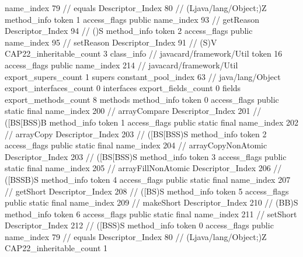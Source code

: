 {{{{{					name_index	79		// equals
					Descriptor_Index	80		// (Ljava/lang/Object;)Z
				}
				method_info {
					token	1
					access_flags	public
					name_index	93		// getReason
					Descriptor_Index	94		// ()S
				}
				method_info {
					token	2
					access_flags	public
					name_index	95		// setReason
					Descriptor_Index	91		// (S)V
				}
			}
			CAP22_inheritable_count	3
		}
		class_info {		// javacard/framework/Util
			token	16
			access_flags	public
			name_index	214		// javacard/framework/Util
			export_supers_count	1
			supers {
				constant_pool_index	63		// java/lang/Object
			}
			export_interfaces_count	0
			interfaces {
			}
			export_fields_count	0
			fields {
			}
			export_methods_count	8
			methods {
				method_info {
					token	0
					access_flags	public static final
					name_index	200		// arrayCompare
					Descriptor_Index	201		// ([BS[BSS)B
				}
				method_info {
					token	1
					access_flags	public static final
					name_index	202		// arrayCopy
					Descriptor_Index	203		// ([BS[BSS)S
				}
				method_info {
					token	2
					access_flags	public static final
					name_index	204		// arrayCopyNonAtomic
					Descriptor_Index	203		// ([BS[BSS)S
				}
				method_info {
					token	3
					access_flags	public static final
					name_index	205		// arrayFillNonAtomic
					Descriptor_Index	206		// ([BSSB)S
				}
				method_info {
					token	4
					access_flags	public static final
					name_index	207		// getShort
					Descriptor_Index	208		// ([BS)S
				}
				method_info {
					token	5
					access_flags	public static final
					name_index	209		// makeShort
					Descriptor_Index	210		// (BB)S
				}
				method_info {
					token	6
					access_flags	public static final
					name_index	211		// setShort
					Descriptor_Index	212		// ([BSS)S
				}
				method_info {
					token	0
					access_flags	public
					name_index	79		// equals
					Descriptor_Index	80		// (Ljava/lang/Object;)Z
				}
			}
			CAP22_inheritable_count	1
		}
	}
}
